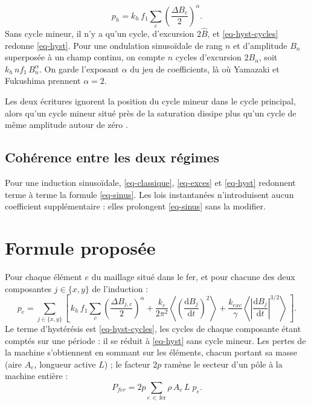 \documentclass[11pt,a4paper]{article}
\newcommand{\dd}{\mathrm{d}}
\newcommand{\moy}[1]{\left\langle #1 \right\rangle}
\newcommand{\Bc}{\hat{B}}
\begin{document}
\begin{equation}
    p_h = k_h\, f_1 \sum_{c} \left(\frac{\Delta B_c}{2}\right)^{\alpha}.
    \label{eq-hyst-cycles}
\end{equation}
Sans cycle mineur, il n'y a qu'un cycle, d'excursion $2\Bc$, et \eqref{eq-hyst-cycles} redonne \eqref{eq-hyst}. Pour une ondulation sinusoïdale de rang $n$ et d'amplitude $B_n$ superposée à un champ continu, on compte $n$ cycles d'excursion $2B_n$, soit $k_h\, n f_1\, B_n^{\alpha}$. On garde l'exposant $\alpha$ du jeu de coefficients, là où Yamazaki et Fukushima prennent $\alpha = 2$.

Les deux écritures ignorent la position du cycle mineur dans le cycle principal, alors qu'un cycle mineur situé près de la saturation dissipe plus qu'un cycle de même amplitude autour de zéro \cite[\S~« The minor loop hysteresis loss »]{Lav78}.

\subsection{Cohérence entre les deux régimes}
Pour une induction sinusoïdale, \eqref{eq-classique}, \eqref{eq-exces} et \eqref{eq-hyst} redonnent terme à terme la formule \eqref{eq-sinus}. Les lois instantanées n'introduisent aucun coefficient supplémentaire : elles prolongent \eqref{eq-sinus} sans la modifier.

\section{Formule proposée}

\begin{retenue}
Pour chaque élément $e$ du maillage situé dans le fer, et pour chacune des deux composantes $j \in \{x, y\}$ de l'induction :
\begin{equation}
    p_e = \sum_{j \in \{x,y\}} \left[\, k_h\, f_1 \sum_{c} \left(\frac{\Delta B_{j,c}}{2}\right)^{\alpha}
    + \frac{k_c}{2\pi^2}\moy{\left(\frac{\dd B_j}{\dd t}\right)^{2}}
    + \frac{k_{exc}}{\gamma}\moy{\left|\frac{\dd B_j}{\dd t}\right|^{3/2}} \,\right].
    \label{eq-retenue}
\end{equation}
Le terme d'hystérésis est \eqref{eq-hyst-cycles}, les cycles de chaque composante étant comptés sur une période : il se réduit à \eqref{eq-hyst} sans cycle mineur. Les pertes de la machine s'obtiennent en sommant sur les éléments, chacun portant sa masse (aire $A_e$, longueur active $L$) ; le facteur $2p$ ramène le secteur d'un pôle à la machine entière :
\begin{equation}
    P_{fer} = 2p \sum_{e \,\in\, \text{fer}} \rho\, A_e\, L \; p_e.
    \label{eq-somme}
\end{equation}
\end{retenue}
\end{document}
